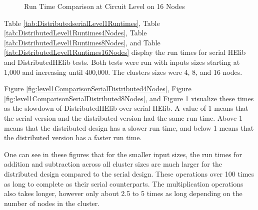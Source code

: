 \begin{figure}[p]
\centering


\caption{Run Time Comparison at Circuit Level on 16 Nodes}
\label{fig:level1ComparisonSerialDistributed16Nodes}
\end{figure}

Table \ref{tab:DistributedserialLevel1Runtimes}, Table \ref{tab:DistributedLevel1Runtimes4Nodes}, Table \ref{tab:DistributedLevel1Runtimes8Nodes}, and Table \ref{tab:DistributedLevel1Runtimes16Nodes} display the run times for serial HElib and DistributedHElib tests. Both tests were run with inputs sizes starting at 1,000 and increasing until 400,000. The clusters sizes were 4, 8, and 16 nodes.

Figure \ref{fig:level1ComparisonSerialDistributed4Nodes}, Figure \ref{fig:level1ComparisonSerialDistributed8Nodes}, and Figure \ref{fig:level1ComparisonSerialDistributed16Nodes} visualize these times as the slowdown of DistributedHElib over serial HElib. A value of 1 means that the serial version and the distributed version had the same run time. Above 1 means that the distributed design has a slower run time, and below 1 means that the distributed version has a faster run time.

One can see in these figures that for the smaller input sizes, the run times for addition and subtraction across all cluster sizes are much larger for the distributed design compared to the serial design. These operations over 100 times as long to complete as their serial counterparts. The multiplication operations also takes longer, however only about 2.5 to 5 times as long depending on the number of nodes in the cluster. 

